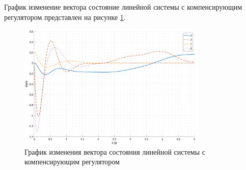 График изменение вектора состояние линейной системы с компенсирующим регулятором представлен на рисунке \ref{fig:compensation_lin_state}.
\begin{figure}[ht!]
    \centering
    \includegraphics[width=0.8\textwidth]{media/plots/compensation/linear_state_1.png}
    \caption{График изменения вектора состояния линейной системы с компенсирующим регулятором}
    \label{fig:compensation_lin_state}
\end{figure}

